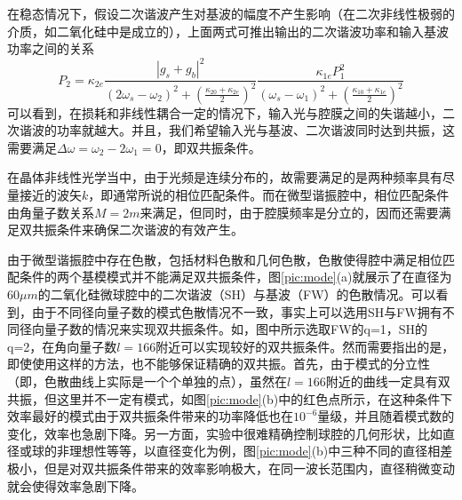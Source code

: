 \documentclass[UTF8,a4paper,cs4size,hyperref]{ctexart}
\begin{document}
在稳态情况下，假设二次谐波产生对基波的幅度不产生影响（在二次非线性极弱的介质，如二氧化硅中是成立的），上面两式可推出输出的二次谐波功率和输入基波功率之间的关系
\begin{equation}
P_2 = \kappa_{2e}\frac{|g_s+g_b|^2}{(2\omega_s-\omega_2)^2+(\frac{\kappa_{20}+\kappa_{2e}}{2})^2}\frac{\kappa_{1e}P_1^2}{(\omega_s-\omega_1)^2+(\frac{\kappa_{10}+\kappa_{1e}}{2})^2}
\end{equation}
可以看到，在损耗和非线性耦合一定的情况下，输入光与腔膜之间的失谐越小，二次谐波的功率就越大。并且，我们希望输入光与基波、二次谐波同时达到共振，这需要满足$\Delta \omega = \omega_2 - 2\omega_1=0$，即双共振条件。

在晶体非线性光学当中，由于光频是连续分布的，故需要满足的是两种频率具有尽量接近的波矢$k$，即通常所说的相位匹配条件。而在微型谐振腔中，相位匹配条件由角量子数关系$M=2m$来满足，但同时，由于腔膜频率是分立的，因而还需要满足双共振条件来确保二次谐波的有效产生。

由于微型谐振腔中存在色散，包括材料色散和几何色散，色散使得腔中满足相位匹配条件的两个基模模式并不能满足双共振条件，图\ref{pic:mode}(a)就展示了在直径为60$\mu m$的二氧化硅微球腔中的二次谐波（SH）与基波（FW）的色散情况。可以看到，由于不同径向量子数的模式色散情况不一致，事实上可以选用SH与FW拥有不同径向量子数的情况来实现双共振条件。如，图中所示选取FW的q=1，SH的q=2，在角向量子数$l=166$附近可以实现较好的双共振条件。然而需要指出的是，即使使用这样的方法，也不能够保证精确的双共振。首先，由于模式的分立性（即，色散曲线上实际是一个个单独的点），虽然在$l=166$附近的曲线一定具有双共振，但这里并不一定有模式，如图\ref{pic:mode}(b)中的红色点所示，在这种条件下效率最好的模式由于双共振条件带来的功率降低也在$10^{-6}$量级，并且随着模式数的变化，效率也急剧下降。另一方面，实验中很难精确控制球腔的几何形状，比如直径或球的非理想性等等，以直径变化为例，图\ref{pic:mode}(b)中三种不同的直径相差极小，但是对双共振条件带来的效率影响极大，在同一波长范围内，直径稍微变动就会使得效率急剧下降。
\end{document}
